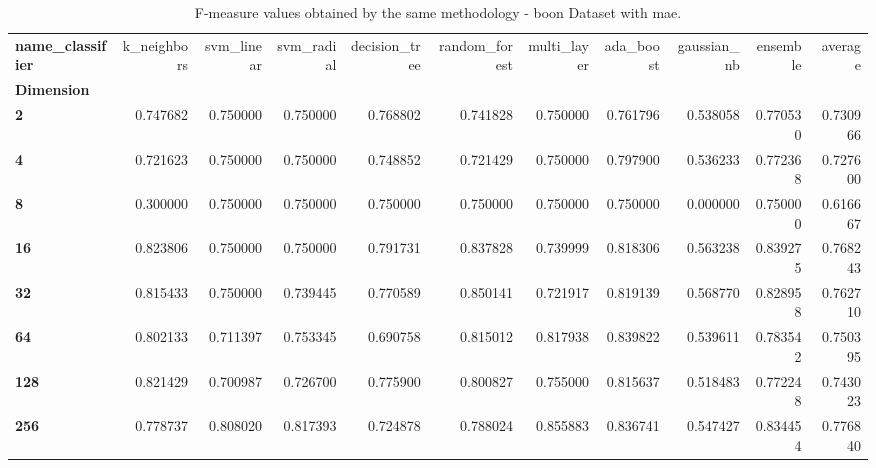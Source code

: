 \begin{table}
\centering
\caption{F-measure values obtained by the same methodology - boon Dataset with mae.}
\label{f-measure_boon_mae-reproduction}
\begin{tabular}{lrrrrrrrrrr}
\toprule
\textbf{name\_classifier} &  k\_neighbors &  svm\_linear &  svm\_radial &  decision\_tree &  random\_forest &  multi\_layer &  ada\_boost &  gaussian\_nb &  ensemble &   average \\
\textbf{Dimension} &              &             &             &                &                &              &            &              &           &           \\
\midrule
\textbf{2        } &     0.747682 &    0.750000 &    0.750000 &       0.768802 &       0.741828 &     0.750000 &   0.761796 &     0.538058 &  0.770530 &  0.730966 \\
\textbf{4        } &     0.721623 &    0.750000 &    0.750000 &       0.748852 &       0.721429 &     0.750000 &   0.797900 &     0.536233 &  0.772368 &  0.727600 \\
\textbf{8        } &     0.300000 &    0.750000 &    0.750000 &       0.750000 &       0.750000 &     0.750000 &   0.750000 &     0.000000 &  0.750000 &  0.616667 \\
\textbf{16       } &     0.823806 &    0.750000 &    0.750000 &       0.791731 &       0.837828 &     0.739999 &   0.818306 &     0.563238 &  0.839275 &  0.768243 \\
\textbf{32       } &     0.815433 &    0.750000 &    0.739445 &       0.770589 &       0.850141 &     0.721917 &   0.819139 &     0.568770 &  0.828958 &  0.762710 \\
\textbf{64       } &     0.802133 &    0.711397 &    0.753345 &       0.690758 &       0.815012 &     0.817938 &   0.839822 &     0.539611 &  0.783542 &  0.750395 \\
\textbf{128      } &     0.821429 &    0.700987 &    0.726700 &       0.775900 &       0.800827 &     0.755000 &   0.815637 &     0.518483 &  0.772248 &  0.743023 \\
\textbf{256      } &     0.778737 &    0.808020 &    0.817393 &       0.724878 &       0.788024 &     0.855883 &   0.836741 &     0.547427 &  0.834454 &  0.776840 \\
\bottomrule
\end{tabular}
\end{table}
